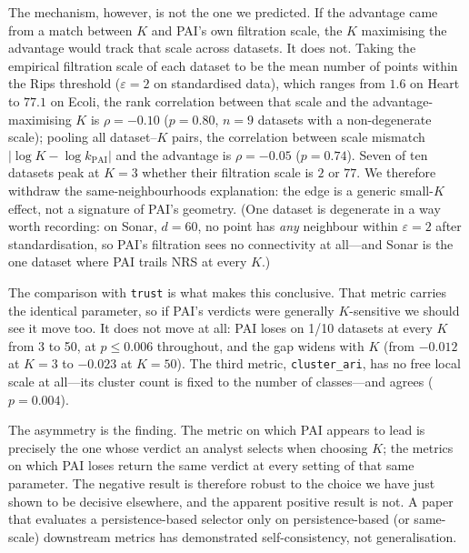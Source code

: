 The mechanism, however, is not the one we predicted.  If the advantage came
from a match between $K$ and PAI's own filtration scale, the $K$ maximising
the advantage would track that scale across datasets.  It does not.  Taking
the empirical filtration scale of each dataset to be the mean number of
points within the Rips threshold ($\varepsilon=2$ on standardised data), which
ranges from $1.6$ on Heart to $77.1$ on Ecoli, the rank correlation between
that scale and the advantage-maximising $K$ is $\rho=-0.10$ ($p=0.80$,
$n=9$ datasets with a non-degenerate scale); pooling all dataset--$K$ pairs,
the correlation between scale mismatch $|\log K - \log k_{\mathrm{PAI}}|$ and
the advantage is $\rho=-0.05$ ($p=0.74$).  Seven of ten datasets peak at
$K=3$ whether their filtration scale is $2$ or $77$.  We therefore withdraw
the same-neighbourhoods explanation: the edge is a generic small-$K$ effect,
not a signature of PAI's geometry.
(One dataset is degenerate in a way worth recording: on Sonar, $d=60$, no
point has \emph{any} neighbour within $\varepsilon=2$ after standardisation,
so PAI's filtration sees no connectivity at all---and Sonar is the one
dataset where PAI trails NRS at every $K$.)

The comparison with \texttt{trust} is what makes this conclusive.  That
metric carries the identical parameter, so if PAI's verdicts were generally
$K$-sensitive we should see it move too.  It does not move at all: PAI loses
on 1/10 datasets at every $K$ from 3 to 50, at $p \leq 0.006$ throughout, and
the gap widens with $K$ (from $-0.012$ at $K=3$ to $-0.023$ at
$K=50$).  The third metric, \texttt{cluster\_ari}, has no free local scale at
all---its cluster count is fixed to the number of classes---and agrees
($p=0.004$).

The asymmetry is the finding.  The metric on which PAI appears to lead is
precisely the one whose verdict an analyst selects when choosing $K$; the
metrics on which PAI loses return the same verdict at every setting of that
same parameter.  The negative result is therefore robust to the choice we
have just shown to be decisive elsewhere, and the apparent positive result is
not.  A paper that evaluates a
persistence-based selector only on persistence-based (or same-scale) downstream
metrics has demonstrated self-consistency, not generalisation.


